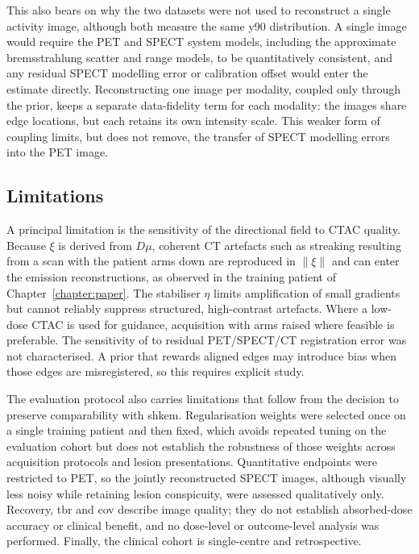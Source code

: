 This also bears on why the two datasets were not used to reconstruct a single activity image, although both measure the same \gls{y90} distribution. A single image would require the PET and SPECT system models, including the approximate bremsstrahlung scatter and range models, to be quantitatively consistent, and any residual SPECT modelling error or calibration offset would enter the estimate directly. Reconstructing one image per modality, coupled only through the prior, keeps a separate data-fidelity term for each modality: the images share edge locations, but each retains its own intensity scale. This weaker form of coupling limits, but does not remove, the transfer of SPECT modelling errors into the PET image.

\subsection{Limitations}
\label{subsec:discussion_limitations}

A principal limitation is the sensitivity of the directional field to CTAC quality. Because $\xi$ is derived from $D\mu$, coherent CT artefacts such as streaking resulting from a scan with the patient arms down are reproduced in $\|\xi\|$ and can enter the emission reconstructions, as observed in the training patient of Chapter~\ref{chapter:paper}. The stabiliser $\eta$ limits amplification of small gradients but cannot reliably suppress structured, high-contrast artefacts. Where a low-dose CTAC is used for guidance, acquisition with arms raised where feasible is preferable. The sensitivity of \wdtnv{} to residual PET/SPECT/CT registration error was not characterised. A prior that rewards aligned edges may introduce bias when those edges are misregistered, so this requires explicit study.

The evaluation protocol also carries limitations that follow from the decision to preserve comparability with \gls{shkem}. Regularisation weights were selected once on a single training patient and then fixed, which avoids repeated tuning on the evaluation cohort but does not establish the robustness of those weights across acquisition protocols and lesion presentations. Quantitative endpoints were restricted to PET, so the jointly reconstructed SPECT images, although visually less noisy while retaining lesion conspicuity, were assessed qualitatively only. Recovery, \gls{tbr} and \gls{cov} describe image quality; they do not establish absorbed-dose accuracy or clinical benefit, and no dose-level or outcome-level analysis was performed. Finally, the clinical cohort is single-centre and retrospective.

